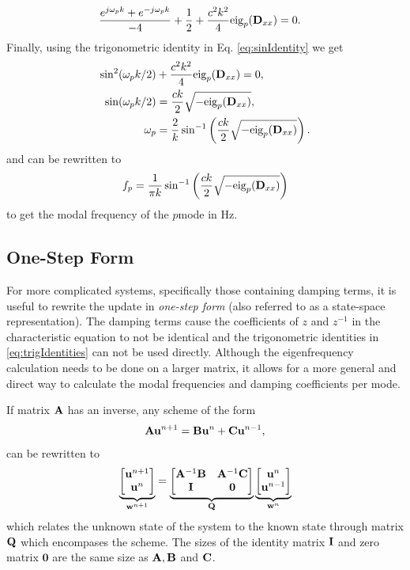 {{\begin{align*}
    \frac{e^{j\omega_pk}+e^{-j\omega_pk}}{-4}+\frac{1}{2}+\frac{c^2k^2}{4}\text{eig}_p(\mathbf{D}_{xx})&=0.
\end{align*}
Finally, using the trigonometric identity in Eq. \eqref{eq:sinIdentity} we get
\begin{align}
    \sin^2(\omega_pk/2)&+\frac{c^2k^2}{4}\text{eig}_p(\mathbf{D}_{xx})=0,\nonumber\\
    \sin(\omega_pk/2)&=\frac{ck}{2}\sqrt{-\text{eig}_p(\mathbf{D}_{xx})},\nonumber\\
    \omega_p &= \frac{2}{k}\sin^{-1}\left(\frac{ck}{2}\sqrt{-\text{eig}_p(\mathbf{D}_{xx})}\right).\label{eq:1DWaveModesAngular}
\end{align}
and can be rewritten to 
\begin{equation}
    f_p = \frac{1}{\pi k}\sin^{-1}\left(\frac{ck}{2}\sqrt{-\text{eig}_p(\mathbf{D}_{xx})}\right)\label{eq:1DWaveModes}
\end{equation}
to get the modal frequency of the $p$\th mode in Hz.

\subsection{One-Step Form}\label{sec:oneStepForm}
For more complicated systems, specifically those containing damping terms, it is useful to rewrite the update in \textit{one-step form} (also referred to as a state-space representation). The damping terms cause the coefficients of $z$ and $z^{-1}$ in the characteristic equation to not be identical and the trigonometric identities in \eqref{eq:trigIdentities} can not be used directly. Although the eigenfrequency calculation needs to be done on a larger matrix, it allows for a more general and direct way to calculate the modal frequencies and damping coefficients per mode. 

If matrix $\mathbf{A}$ has an inverse, any scheme of the form
\begin{equation}\label{eq:modalForm}
    \mathbf{A}\mathbf{u}^{n+1}=\mathbf{B}\mathbf{u}^n + \mathbf{C}\mathbf{u}^{n-1},
\end{equation}
can be rewritten to
\begin{equation}\label{eq:oneStepForm}
    \underbrace{\begin{bmatrix}
        \mathbf{u}^{n+1}\\
        \mathbf{u}^n
    \end{bmatrix}}_{\mathbf{w}^{n+1}} = 
    \underbrace{\begin{bmatrix}
        \mathbf{A}^{-1}\mathbf{B} & \mathbf{A}^{-1}\mathbf{C}\\
        \mathbf{I} & \mathbf{0}
    \end{bmatrix}}_{\mathbf{Q}}
    \underbrace{\begin{bmatrix}
        \mathbf{u}^n\\
        \mathbf{u}^{n-1}
    \end{bmatrix}}_{\mathbf{w}^n}
\end{equation}
which relates the unknown state of the system to the known state through matrix $\mathbf{Q}$ which encompases the scheme. The sizes of the identity matrix $\mathbf{I}$ and zero matrix $\mathbf{0}$ are the same size as $\mathbf{A}, \mathbf{B}$ and $\mathbf{C}$.

}}
